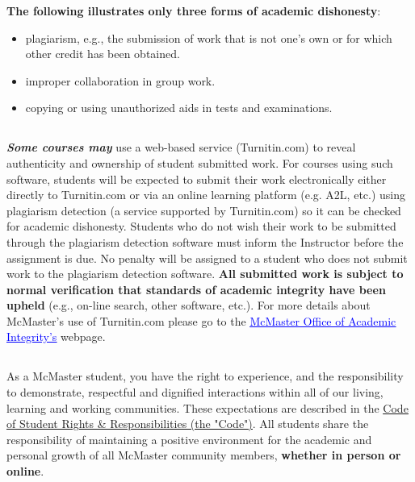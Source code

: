 \documentclass[hidelinks,11pt]{article}
\begin{document}
\vspace{1.5em}\textbf{The following illustrates only three forms of academic dishonesty}:
    
    \begin{itemize}\itemsep0em
        \item plagiarism, e.g., the submission of work that is not one’s own or for which other credit has been obtained.
        \item improper collaboration in group work.
        \item copying or using unauthorized aids in tests and examinations.
    \end{itemize}

\subsection*{{}}
\textbf{\emph{Some courses may}} use a web-based service (Turnitin.com) to reveal authenticity and ownership of student submitted work. For courses using such software, students will be expected to submit their work electronically either directly to Turnitin.com or via an online learning platform (e.g. A2L, etc.) using plagiarism detection (a service supported by Turnitin.com) so it can be checked for academic dishonesty. Students who do not wish their work to be submitted through the plagiarism detection software must inform the Instructor before the assignment is due. No penalty will be assigned to a student who does not submit work to the plagiarism detection software. \textbf{All submitted work is subject to normal verification that standards of academic integrity have been upheld} (e.g., on-line search, other software, etc.). For more details about McMaster’s use of Turnitin.com please go to the \href{www.mcmaster.ca/academicintegrity}{\textcolor{blue}{\underline{McMaster Office of Academic Integrity’s}}} webpage.

\subsection*{{}}
As a McMaster student, you have the right to experience, and the responsibility to demonstrate, respectful and dignified interactions within all of our living, learning and working communities. These expectations are described in the \href{https://secretariat.mcmaster.ca/app/uploads/Code-of-Student-Rights-and-Responsibilities.pdf}{\underline{Code of Student Rights \& Responsibilities (the "Code")}}. All students share the responsibility of maintaining a positive environment for the academic and personal growth of all McMaster community members, \textbf{whether in person or online}.
\end{document}
